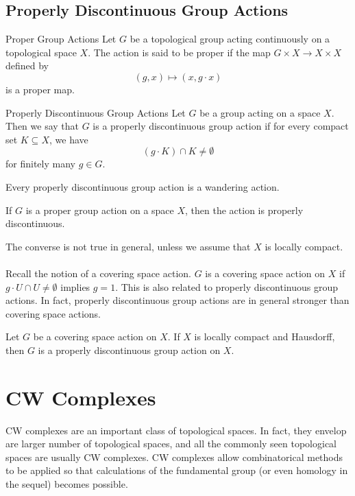 \documentclass[a4paper]{article}
\begin{document}
\subsection{Properly Discontinuous Group Actions}
\begin{defn}{Proper Group Actions}{} Let $G$ be a topological group acting continuously on a topological space $X$. The action is said to be proper if the map $G\times X\to X\times X$ defined by $$(g,x)\mapsto(x,g\cdot x)$$ is a proper map. 
\end{defn}

\begin{defn}{Properly Discontinuous Group Actions}{} Let $G$ be a group acting on a space $X$. Then we say that $G$ is a properly discontinuous group action if for every compact set $K\subseteq X$, we have $$(g\cdot K)\cap K\neq\emptyset$$ for finitely many $g\in G$. 
\end{defn}

\begin{prp}{}{} Every properly discontinuous group action is a wandering action. 
\end{prp}

\begin{prp}{}{} If $G$ is a proper group action on a space $X$, then the action is properly discontinuous. 
\end{prp}

The converse is not true in general, unless we assume that $X$ is locally compact. \\~\\

Recall the notion of a covering space action. $G$ is a covering space action on $X$ if $g\cdot U\cap U\neq\emptyset$ implies $g=1$. This is also related to properly discontinuous group actions. In fact, properly discontinuous group actions are in general stronger than covering space actions. 

\begin{prp}{}{} Let $G$ be a covering space action on $X$. If $X$ is locally compact and Hausdorff, then $G$ is a properly discontinuous group action on $X$. 
\end{prp}


\pagebreak
\section{CW Complexes}
CW complexes are an important class of topological spaces. In fact, they envelop are larger number of topological spaces, and all the commonly seen topological spaces are usually CW complexes. CW complexes allow combinatorical methods to be applied so that calculations of the fundamental group (or even homology in the sequel) becomes possible. 
\end{document}
